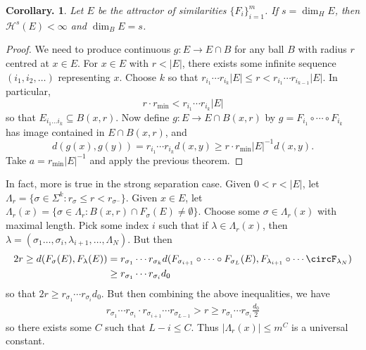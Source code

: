 \documentclass[11pt, a4paper]{memoir}
\theoremstyle{change}
\newtheorem{corollary}[theorem]{Corollary.}
\theoremstyle{plain}
\theoremstyle{nonumberplain}
\newtheorem{proof}{Proof}
\numberwithin{equation}{section}
\begin{document}
\begin{corollary}
    Let $E$ be the attractor of similarities $\{F_i\}_{i=1}^m$. %
    If $s=\dim_H E$, then $\mathcal{H}^s(E)<\infty$ and $\dim_B E=s$.
\end{corollary}
\begin{proof}
    We need to produce continuous $g:E\to E\cap B$ for any ball $B$ with radius $r$ centred at $x\in E$.
    For $x\in E$ with $r<|E|$, there exists some infinite sequence $(i_1,i_2,\ldots)$ representing $x$.
    Choose $k$ so that $r_{i_1}\cdots r_{i_k}|E|\leq r<r_{i_1}\cdots r_{i_{k-1}}|E|$.
    In particular,
    \begin{equation*}
        r\cdot r_{\min}<r_{i_1}\cdots r_{i_k}|E|
    \end{equation*}
    so that $E_{i_1\ldots i_k}\subseteq B(x,r)$.
    Now define $g:E\to E\cap B(x,r)$ by $g=F_{i_1}\circ\cdots\circ F_{i_k}$ has image contained in $E\cap B(x,r)$, and
    \begin{equation*}
        d(g(x),g(y))=r_{i_1}\cdots r_{i_k}d(x,y)\geq r\cdot r_{\min}|E|^{-1}d(x,y).
    \end{equation*}
    Take $a=r_{\min}|E|^{-1}$ and apply the previous theorem.
\end{proof}
In fact, more is true in the strong separation case.
Given $0<r<|E|$, let $\Lambda_r=\{\sigma\in\Sigma^k:r_\sigma\leq r<r_{\sigma^-}\}$.
Given $x\in E$, let $\Lambda_r(x)=\{\sigma\in\Lambda_r:B(x,r)\cap F_\sigma(E)\neq\emptyset\}$.
Choose some $\sigma\in\Lambda_r(x)$ with maximal length.
Pick some index $i$ such that if $\lambda\in\Lambda_r(x)$, then $\lambda=(\sigma_1\ldots,\sigma_i,\lambda_{i+1},\ldots,\Lambda_N)$.
But then
\begin{align*}
    2r\geq d(F_\sigma(E),F_\lambda(E)) &= r_{\sigma_1}\cdots r_{\sigma_k}d(F_{\sigma_{i+1}}\circ\cdots\circ F_{\sigma_L}(E),F_{\lambda_{i+1}}\circ\cdots\circF_{\lambda_N})\\
                                       &\geq r_{\sigma_1}\cdots r_{\sigma_i}d_0
\end{align*}
so that $2r\geq r_{\sigma_1}\cdots r_{\sigma_i}d_0$.
But then combining the above inequalities, we have
\begin{align*}
    r_{\sigma_1}\cdots r_{\sigma_i}\cdot r_{\sigma_{i+1}}\cdots r_{\sigma_{L-1}} >r\geq r_{\sigma_1}\cdots r_{\sigma_i}\frac{d_0}{2}
\end{align*}
so there exists some $C$ such that $L-i\leq C$.
Thus $|\Lambda_r(x)|\leq m^C$ is a universal constant.
\end{document}
